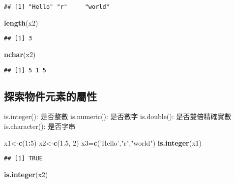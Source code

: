 \documentclass[]{article}
\newenvironment{Shaded}{\begin{snugshade}}{\end{snugshade}}
\newcommand{\DecValTok}[1]{\textcolor[rgb]{0.00,0.00,0.81}{#1}}
\newcommand{\FloatTok}[1]{\textcolor[rgb]{0.00,0.00,0.81}{#1}}
\newcommand{\KeywordTok}[1]{\textcolor[rgb]{0.13,0.29,0.53}{\textbf{#1}}}
\newcommand{\NormalTok}[1]{#1}
\newcommand{\OperatorTok}[1]{\textcolor[rgb]{0.81,0.36,0.00}{\textbf{#1}}}
\newcommand{\StringTok}[1]{\textcolor[rgb]{0.31,0.60,0.02}{#1}}
\begin{document}
\begin{verbatim}
## [1] "Hello" "r"     "world"
\end{verbatim}

\begin{Shaded}
\begin{Highlighting}[]
\KeywordTok{length}\NormalTok{(x2)}
\end{Highlighting}
\end{Shaded}

\begin{verbatim}
## [1] 3
\end{verbatim}

\begin{Shaded}
\begin{Highlighting}[]
\KeywordTok{nchar}\NormalTok{(x2)}
\end{Highlighting}
\end{Shaded}

\begin{verbatim}
## [1] 5 1 5
\end{verbatim}

\hypertarget{ux63a2ux7d22ux7269ux4ef6ux5143ux7d20ux7684ux5c6cux6027}{%
\subsection{探索物件元素的屬性}\label{ux63a2ux7d22ux7269ux4ef6ux5143ux7d20ux7684ux5c6cux6027}}

is.integer(): 是否整數 is.numeric(): 是否數字 is.double():
是否雙倍精確實數 is.character(): 是否字串

\begin{Shaded}
\begin{Highlighting}[]
\NormalTok{x1<-}\KeywordTok{c}\NormalTok{(}\DecValTok{1}\OperatorTok{:}\DecValTok{5}\NormalTok{)}
\NormalTok{x2<-}\KeywordTok{c}\NormalTok{(}\FloatTok{1.5}\NormalTok{, }\DecValTok{2}\NormalTok{)}
\NormalTok{x3=}\KeywordTok{c}\NormalTok{(}\StringTok{'Hello'}\NormalTok{,}\StringTok{"r"}\NormalTok{,}\StringTok{"world"}\NormalTok{)}
\KeywordTok{is.integer}\NormalTok{(x1)}
\end{Highlighting}
\end{Shaded}

\begin{verbatim}
## [1] TRUE
\end{verbatim}

\begin{Shaded}
\begin{Highlighting}[]
\KeywordTok{is.integer}\NormalTok{(x2)}
\end{Highlighting}
\end{Shaded}
\end{document}

